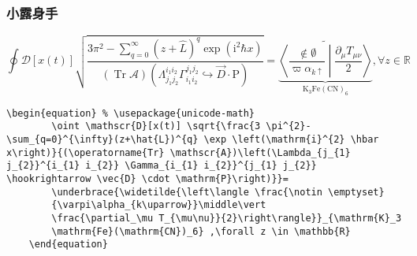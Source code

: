 \begin{frame}[fragile]
\frametitle{小露身手}
  \begin{equation*}
    \oint \mathscr{D}[x(t)] \sqrt{\frac{3 \pi^{2}-\sum_{q=0}^{\infty}(z+\hat{L})^{q} \exp \left(\mathrm{i}^{2} \hbar x\right)}{(\operatorname{Tr} \mathscr{A})\left(\Lambda_{j_{1} j_{2}}^{i_{1} i_{2}} \Gamma_{i_{1} i_{2}}^{j_{1} j_{2}} \hookrightarrow \vec{D} \cdot \mathrm{P}\right)}}=
    \underbrace{\widetilde{\left\langle \frac{\notin \emptyset}
    {\varpi\alpha_{k\uparrow}}\middle\vert
    \frac{\partial_\mu T_{\mu\nu}}{2}\right\rangle}}_{\mathrm{K}_3
    \mathrm{Fe}(\mathrm{CN})_6} ,\forall z \in \mathbb{R}
  \end{equation*}

  \begin{lstlisting}[basicstyle=\ttfamily\small]
    \begin{equation} % \usepackage{unicode-math}
        \oint \mathscr{D}[x(t)] \sqrt{\frac{3 \pi^{2}-\sum_{q=0}^{\infty}(z+\hat{L})^{q} \exp \left(\mathrm{i}^{2} \hbar x\right)}{(\operatorname{Tr} \mathscr{A})\left(\Lambda_{j_{1} j_{2}}^{i_{1} i_{2}} \Gamma_{i_{1} i_{2}}^{j_{1} j_{2}} \hookrightarrow \vec{D} \cdot \mathrm{P}\right)}}=
        \underbrace{\widetilde{\left\langle \frac{\notin \emptyset}
        {\varpi\alpha_{k\uparrow}}\middle\vert
        \frac{\partial_\mu T_{\mu\nu}}{2}\right\rangle}}_{\mathrm{K}_3
        \mathrm{Fe}(\mathrm{CN})_6} ,\forall z \in \mathbb{R}
    \end{equation}
    \end{lstlisting}


\end{frame}

